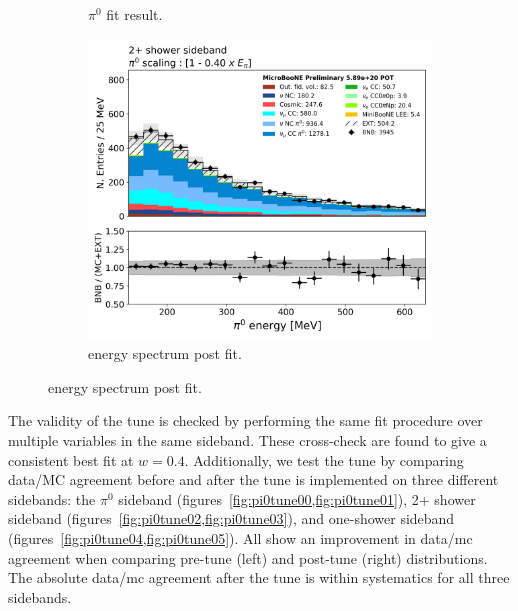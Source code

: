 \begin{figure}[H]
\begin{center}
\begin{subfigure}[b]{0.27\textwidth}
    \caption{\label{fig:pi0fitresult} $\pi^0$ fit result.}
    \end{subfigure}
    \begin{subfigure}[b]{0.33\textwidth}
    \centering
    \includegraphics[width=1.00\textwidth]{pi0/pi0tune/pi0energy_040_scaling.png}
    \caption{\label{fig:pi0fitspectrum}energy spectrum post fit.}
    \end{subfigure}
\end{center}
\end{figure}

The validity of the tune is checked by performing the same fit procedure over multiple variables in the same sideband. These cross-check are found to give a consistent best fit at $w = 0.4$. Additionally, we test the tune by comparing data/MC agreement before and after the tune is implemented on three different sidebands: the $\pi^0$ sideband (figures~\cref{fig:pi0tune00,fig:pi0tune01}), 2+ shower sideband (figures~\cref{fig:pi0tune02,fig:pi0tune03}), and one-shower sideband (figures~\cref{fig:pi0tune04,fig:pi0tune05}). All show an improvement in data/mc agreement when comparing pre-tune (left) and post-tune (right) distributions. The absolute data/mc agreement after the tune is within systematics for all three sidebands.

